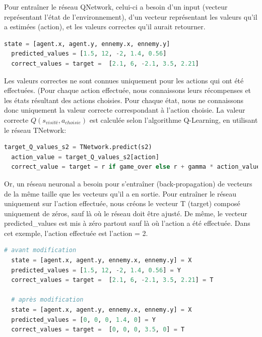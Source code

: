 \documentclass[11pt,a4paper]{report}
\begin{document}
  \par Pour entraîner le réseau QNetwork, celui-ci a besoin d'un input (vecteur représentant l'état de l'environnement), d'un vecteur représentant les valeurs qu'il a estimées (action), et les valeurs correctes qu'il aurait retourner. 
  
  \begin{lstlisting}[language=python]
  state = [agent.x, agent.y, ennemy.x, ennemy.y]
  predicted_values = [1.5, 12, -2, 1.4, 0.56]
  correct_values = target =  [2.1, 6, -2.1, 3.5, 2.21]
  \end{lstlisting} 
  
  \par Les valeurs correctes ne sont connues uniquement pour les actions qui ont été effectuées. (Pour chaque action effectuée, nous connaissons leurs récompenses et les états résultant des actions choisies. Pour chaque état, nous ne connaissons donc uniquement la valeur correcte correspondant à l'action choisie. La valeur correcte $Q(s_{visité}, a_{choisie})$ est calculée selon l'algorithme Q-Learning, en utilisant le réseau TNetwork:
  
  \begin{lstlisting}[language=python]
  target_Q_values_s2 = TNetwork.predict(s2)
  action_value = target_Q_values_s2[action]
  correct_value = target = r if game_over else r + gamma * action_value
  \end{lstlisting}   
  
  \par Or, un réseau neuronal a besoin pour s’entraîner (back-propagation) de vecteurs de la même taille que les vecteurs qu'il a en sortie. Pour entraîner le réseau uniquement sur l'action effectuée, nous créons le vecteur T (target) composé uniquement de zéros, sauf là où le réseau doit être ajusté. De même, le vecteur predicted\_values est mis à zéro partout sauf là où l'action a été effectuée. Dans cet exemple, l'action effectuée est l'action = 2. 
  
  \begin{lstlisting}[language=python]
  # avant modification
  state = [agent.x, agent.y, ennemy.x, ennemy.y] = X
  predicted_values = [1.5, 12, -2, 1.4, 0.56] = Y
  correct_values = target =  [2.1, 6, -2.1, 3.5, 2.21] = T
  
  # après modification
  state = [agent.x, agent.y, ennemy.x, ennemy.y] = X
  predicted_values = [0, 0, 0, 1.4, 0] = Y
  correct_values = target =  [0, 0, 0, 3.5, 0] = T
  \end{lstlisting} 
  
\end{document}
